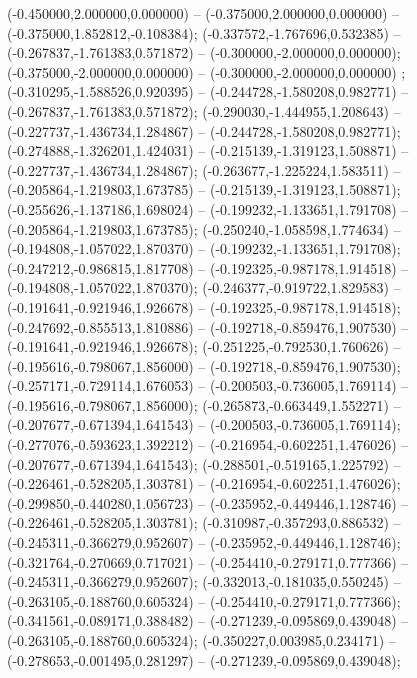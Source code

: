  (-0.450000,2.000000,0.000000) -- (-0.375000,2.000000,0.000000) -- (-0.375000,1.852812,-0.108384);
 (-0.337572,-1.767696,0.532385) -- (-0.267837,-1.761383,0.571872) -- (-0.300000,-2.000000,0.000000);
 (-0.375000,-2.000000,0.000000) -- (-0.300000,-2.000000,0.000000) ;
 (-0.310295,-1.588526,0.920395) -- (-0.244728,-1.580208,0.982771) -- (-0.267837,-1.761383,0.571872);
 (-0.290030,-1.444955,1.208643) -- (-0.227737,-1.436734,1.284867) -- (-0.244728,-1.580208,0.982771);
 (-0.274888,-1.326201,1.424031) -- (-0.215139,-1.319123,1.508871) -- (-0.227737,-1.436734,1.284867);
 (-0.263677,-1.225224,1.583511) -- (-0.205864,-1.219803,1.673785) -- (-0.215139,-1.319123,1.508871);
 (-0.255626,-1.137186,1.698024) -- (-0.199232,-1.133651,1.791708) -- (-0.205864,-1.219803,1.673785);
 (-0.250240,-1.058598,1.774634) -- (-0.194808,-1.057022,1.870370) -- (-0.199232,-1.133651,1.791708);
 (-0.247212,-0.986815,1.817708) -- (-0.192325,-0.987178,1.914518) -- (-0.194808,-1.057022,1.870370);
 (-0.246377,-0.919722,1.829583) -- (-0.191641,-0.921946,1.926678) -- (-0.192325,-0.987178,1.914518);
 (-0.247692,-0.855513,1.810886) -- (-0.192718,-0.859476,1.907530) -- (-0.191641,-0.921946,1.926678);
 (-0.251225,-0.792530,1.760626) -- (-0.195616,-0.798067,1.856000) -- (-0.192718,-0.859476,1.907530);
 (-0.257171,-0.729114,1.676053) -- (-0.200503,-0.736005,1.769114) -- (-0.195616,-0.798067,1.856000);
 (-0.265873,-0.663449,1.552271) -- (-0.207677,-0.671394,1.641543) -- (-0.200503,-0.736005,1.769114);
 (-0.277076,-0.593623,1.392212) -- (-0.216954,-0.602251,1.476026) -- (-0.207677,-0.671394,1.641543);
 (-0.288501,-0.519165,1.225792) -- (-0.226461,-0.528205,1.303781) -- (-0.216954,-0.602251,1.476026);
 (-0.299850,-0.440280,1.056723) -- (-0.235952,-0.449446,1.128746) -- (-0.226461,-0.528205,1.303781);
 (-0.310987,-0.357293,0.886532) -- (-0.245311,-0.366279,0.952607) -- (-0.235952,-0.449446,1.128746);
 (-0.321764,-0.270669,0.717021) -- (-0.254410,-0.279171,0.777366) -- (-0.245311,-0.366279,0.952607);
 (-0.332013,-0.181035,0.550245) -- (-0.263105,-0.188760,0.605324) -- (-0.254410,-0.279171,0.777366);
 (-0.341561,-0.089171,0.388482) -- (-0.271239,-0.095869,0.439048) -- (-0.263105,-0.188760,0.605324);
 (-0.350227,0.003985,0.234171) -- (-0.278653,-0.001495,0.281297) -- (-0.271239,-0.095869,0.439048);
